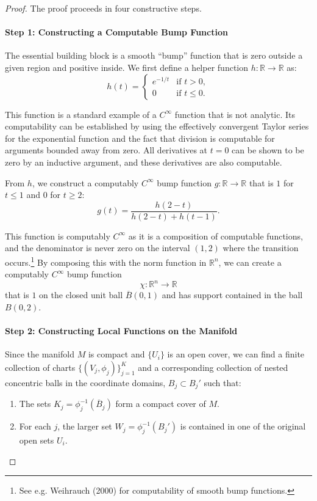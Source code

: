 \documentclass[12pt, a4paper]{article}
\begin{document}
\begin{proof}
The proof proceeds in four constructive steps.

\paragraph{Step 1: Constructing a Computable Bump Function}

The essential building block is a smooth ``bump'' function that is zero outside a given region and positive inside. We first define a helper function $h : \mathbb{R} \to \mathbb{R}$ as:
\[
h(t) = \begin{cases}
e^{-1/t} & \text{if } t > 0, \\
0 & \text{if } t \leq 0.
\end{cases}
\]

This function is a standard example of a $C^\infty$ function that is not analytic. Its computability can be established by using the effectively convergent Taylor series for the exponential function and the fact that division is computable for arguments bounded away from zero. All derivatives at $t=0$ can be shown to be zero by an inductive argument, and these derivatives are also computable.

From $h$, we construct a computably $C^\infty$ bump function $g : \mathbb{R} \to \mathbb{R}$ that is $1$ for $t \leq 1$ and $0$ for $t \geq 2$:
\[
g(t) = \frac{h(2 - t)}{h(2 - t) + h(t - 1)}.
\]

This function is computably $C^\infty$ as it is a composition of computable functions, and the denominator is never zero on the interval $(1, 2)$ where the transition occurs.\footnote{See e.g. Weihrauch (2000) for computability of smooth bump functions.} By composing this with the norm function in $\mathbb{R}^n$, we can create a computably $C^\infty$ bump function
\[
\chi : \mathbb{R}^n \to \mathbb{R}
\]
that is $1$ on the closed unit ball $\overline{B}(0,1)$ and has support contained in the ball $B(0,2)$.

\paragraph{Step 2: Constructing Local Functions on the Manifold}

Since the manifold $M$ is compact and $\{ U_i \}$ is an open cover, we can find a finite collection of charts $\{ (V_j, \phi_j) \}_{j=1}^K$ and a corresponding collection of nested concentric balls in the coordinate domains, $B_j \subset B_j'$ such that:
\begin{enumerate}
    \item The sets $K_j = \phi_j^{-1}(\overline{B}_j)$ form a compact cover of $M$.
    \item For each $j$, the larger set $W_j = \phi_j^{-1}(B_j')$ is contained in one of the original open sets $U_i$.
\end{enumerate}


\end{proof}
\end{document}
